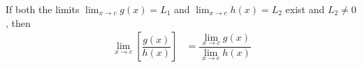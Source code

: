 \documentclass[20150903-160354-rs2.2-MarksMathNotebook.tex]{subfiles}
\begin{document}
\begin{arule}
If both the limits $\displaystyle \lim_{x \to c} g(x)=L_1$ and $\displaystyle \lim_{x \to c} h(x)=L_2$ exist and $L_2 \ne 0$ , then
\begin{align}
	\displaystyle \lim_{x \to c} \left[ \dfrac{g(x)}{h(x)}\right] &=  \dfrac{\displaystyle \lim_{x \to c} g(x)}{\displaystyle \lim_{x \to c} h(x)}  \label{eq:altq} 
\end{align}
\end{arule}
\end{document}
